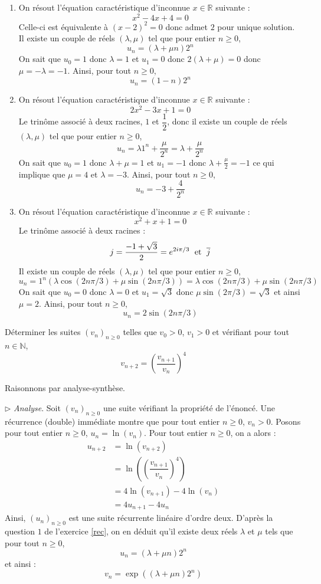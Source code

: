 \documentclass[a4paper,10pt]{report}
\begin{document}
\begin{enumerate}
\item On résout l'équation caractéristique d'inconnue $x \in \mathbb{R}$ suivante :
$$ x^2-4x+4=0$$
Celle-ci est équivalente à $(x-2)^2=0$ donc admet $2$ pour unique solution. Il existe un couple de réels $(\lambda, \mu)$ tel que pour entier $n \geq 0$,
$$ u_{n} = (\lambda + \mu n) 2^n$$
On sait que $u_0= 1$ donc $\lambda=1$ et $u_1=0$ donc $2(\lambda+\mu)=0$ donc $\mu= - \lambda = -1$. Ainsi, pour tout $n \geq 0$,
$$ u_n = (1-n)2^n$$
\item On résout l'équation caractéristique d'inconnue $x \in \mathbb{R}$ suivante :
$$ 2x^2-3x+1=0$$
Le trinôme associé à deux racines, $1$ et $\dfrac{1}{2}$, donc il existe un couple de réels $(\lambda, \mu)$ tel que pour entier $n \geq 0$,
$$ u_{n} = \lambda 1^n + \dfrac{\mu}{2^n} = \lambda +\dfrac{\mu}{2^n}$$
On sait que $u_0= 1$ donc $\lambda+ \mu=1$ et $u_1=-1$ donc $\lambda+\frac{\mu}{2}=-1$ ce qui implique que $\mu=4$ et $\lambda = -3$. Ainsi, pour tout $n \geq 0$,
$$ u_n =-3 + \dfrac{4}{2^n}$$
\item On résout l'équation caractéristique d'inconnue $x \in \mathbb{R}$ suivante :
$$ x^2+x+1=0$$
Le trinôme associé à deux racines :
$$ j = \dfrac{-1+\sqrt{3}}{2} = e^{2i \pi/3} \; \hbox{ et } \; \overline{j}$$
Il existe un couple de réels $(\lambda, \mu)$ tel que pour entier $n \geq 0$,
$$ u_{n} = 1^n (\lambda \cos(2n \pi/3) + \mu \sin(2n \pi/3)) = \lambda \cos(2n \pi/3) + \mu \sin(2n \pi/3)$$
On sait que $u_0= 0$ donc $\lambda=0$ et $u_1=\sqrt{3}$ donc $\mu \sin(2\pi/3)=\sqrt{3}$ et ainsi $\mu=2$. Ainsi, pour tout $n \geq 0$,
$$ u_n = 2 \sin(2n \pi/3)$$
\end{enumerate}

\medskip


\begin{Exa} Déterminer les suites $(v_n)_{n \geq 0}$ telles que $v_0>0$, $v_1>0$  et vérifiant pour tout $n \in \mathbb{N}$, 
$$v_{n+2}=\left(\dfrac{v_{n+1}}{v_n}\right)^4$$
\end{Exa}
\corr Raisonnons par analyse-synthèse. 

\medskip

\noindent $\rhd$ \textit{Analyse}. Soit $(v_n)_{n \geq 0}$ une suite vérifiant la propriété de l'énoncé. Une récurrence (double) immédiate montre que pour tout entier $n \geq 0$, $v_n>0$. Posons pour tout entier $n \geq 0$, $u_n = \ln(v_n)$. Pour tout entier $n \geq 0$, on a alors :
\begin{align*}
u_{n+2} & = \ln(v_{n+2}) \\
& = \ln \left(\left(\dfrac{v_{n+1}}{v_n}\right)^4\right) \\
& = 4 \ln(v_{n+1}) - 4 \ln(v_n) \\
& = 4 u_{n+1} - 4 u_n 
\end{align*}
Ainsi, $(u_n)_{n \geq 0}$ est une suite récurrente linéaire d'ordre deux. D'après la question $1$ de l'exercice \ref{rec}, on en déduit qu'il existe deux réels $\lambda$ et $\mu$ tels que pour tout $n \geq 0$,
$$ u_n = (\lambda+\mu n)2^n$$
et ainsi :
$$ v_n = \exp((\lambda+ \mu n)2^n)$$
\end{document}
